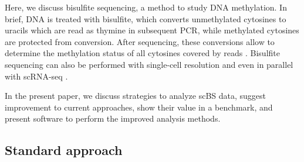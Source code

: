 \documentclass[twocolumn,10pt]{article}
\begin{document}
Here, we discuss bisulfite sequencing, a method to study DNA methylation. In brief, DNA is treated with bisulfite, which converts unmethylated cytosines to uracils which are read as thymine in subsequent PCR, while methylated cytosines are protected from conversion. After sequencing, these conversions allow to determine the methylation status of all cytosines covered by reads \citep{Frommer_1992}. Bisulfite sequencing can also be performed with single-cell resolution \citep{Smallwood_2014} and even in parallel with scRNA-seq \citep{Clark2018}.

In the present paper, we discuss strategies to analyze scBS data, suggest improvement to current approaches, show their value in a benchmark, and present software to perform the improved analysis methods.

\subsection{Standard approach}
\end{document}
